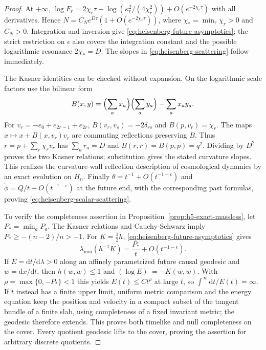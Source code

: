 \documentclass[10pt,a4paper]{article}
\numberwithin{equation}{section}
\theoremstyle{definition}
\theoremstyle{remark}
\newcommand{\dd}{\mathrm d}
\begin{document}
\begin{proof}
At $+\infty$, $\log F_r=2\chi_r\tau+
\log(\kappa_r^2/(4\chi_r^2))+O(e^{-2\chi_r\tau})$ with all
derivatives.  Hence $N=C_Ne^{D\tau}(1+O(e^{-2\chi_*\tau}))$,
where $\chi_* =\min_r\chi_r>0$ and $C_N>0$.
Integration and inversion give \eqref{eq:heisenberg-future-asymptotics};
the strict restriction on $\epsilon$ also covers the integration
constant and the possible logarithmic resonance $2\chi_*=D$.
The slopes in \eqref{eq:heisenberg-scattering} follow immediately.

The Kasner identities can be checked without expansion.  On the
logarithmic scale factors use the bilinear form
\[
 B(x,y)=\Bigl(\sum_a x_a\Bigr)\Bigl(\sum_a y_a\Bigr)
                                  -\sum_a x_ay_a.
\]
For $v_r=-e_0+e_{2r-1}+e_{2r}$,
$B(v_r,v_s)=-2\delta_{rs}$ and $B(p,v_r)=\chi_r$.
The maps $x\mapsto x+B(x,v_r)v_r$ are commuting reflections preserving
$B$.  Thus $r=p+\sum_r\chi_rv_r$ has
$\sum_a r_a=D$ and $B(r,r)=B(p,p)=q^2$.
Dividing by $D^2$ proves the two Kasner relations; substitution gives
the stated curvature slopes.  This realizes the curvature-wall
reflection description of cosmological dynamics
\cite{DamourHenneauxNicolai2003} by an exact evolution on $H_n$.
Finally $\theta=t^{-1}+O(t^{-1-\epsilon})$ and
$\dot\phi=Q/t+O(t^{-1-\epsilon})$ at the future end, with the
corresponding past formulas, proving
\eqref{eq:heisenberg-scalar-scattering}.

To verify the completeness assertion in
Proposition~\ref{prop:h5-exact-massless}, let $P_* =\min_aP_a$.
The Kasner relations and Cauchy-Schwarz imply
$P_*\ge-(n-2)/n>-1$.
For $K=\tfrac12\dot h$, \eqref{eq:heisenberg-future-asymptotics} gives
\[
 \lambda_{\min}(h^{-1}K)=\frac{P_*}{t}+O(t^{-1-\epsilon}).
\]
If $E=\dd t/\dd\lambda>0$ along an affinely parametrized future
causal geodesic and $w=\dd x/\dd t$, then $h(w,w)\le1$ and
$(\log E)^{\displaystyle\cdot}=-K(w,w)$.  With
$\rho=\max\{0,-P_*\}<1$ this yields
$E(t)\le Ct^\rho$ at large $t$, so
$\int^\infty\dd t/E(t)=\infty$.
If $t$ instead has a finite upper limit, uniform metric comparison and
the energy equation keep the position and velocity in a compact subset
of the tangent bundle of a finite slab, using completeness of a fixed
invariant metric; the geodesic therefore extends.  This proves both
timelike and null completeness on the cover.  Every quotient geodesic
lifts to the cover, proving the assertion for arbitrary discrete
quotients.
\end{proof}
\end{document}
